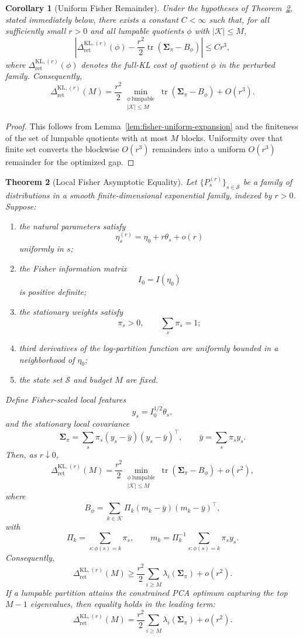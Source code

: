 \documentclass[12pt]{article}
\newtheorem{theorem}{Theorem}[section]
\newtheorem{corollary}[theorem]{Corollary}
\theoremstyle{definition}
\newcommand{\RetKLr}[1]{\Delta_{\mathrm{ret}}^{\mathrm{KL},(#1)}}
\begin{document}
\begin{corollary}[Uniform Fisher Remainder]
\label{cor:fisher-uniform-remainder}
Under the hypotheses of Theorem~\ref{thm:local-full-kl}, stated immediately
below, there exists a constant $C<\infty$ such that, for all sufficiently
small $r>0$ and all
lumpable quotients $\phi$ with $|\mathcal K|\le M$,
\[
\left|
\RetKLr{r}(\phi)
-
\frac{r^2}{2}
\operatorname{tr}(\bm{\Sigma}_\pi-B_\phi)
\right|
\le
C r^3,
\]
where $\RetKLr{r}(\phi)$ denotes the full-KL cost of quotient $\phi$ in the
perturbed family.  Consequently,
\[
\RetKLr{r}(M)
=
\frac{r^2}{2}
\min_{\substack{
\phi\ \text{lumpable}\\
|\mathcal K|\le M
}}
\operatorname{tr}(\bm{\Sigma}_\pi-B_\phi)
+
O(r^3).
\]
\end{corollary}

\begin{proof}
This follows from Lemma~\ref{lem:fisher-uniform-expansion} and the finiteness
of the set of lumpable quotients with at most $M$ blocks.  Uniformity over
that finite set converts the blockwise $O(r^3)$ remainders into a uniform
$O(r^3)$ remainder for the optimized gap.
\end{proof}

\begin{theorem}[Local Fisher Asymptotic Equality]
\label{thm:local-full-kl}
Let $\{P_s^{(r)}\}_{s\in\mathcal S}$ be a family of distributions in a smooth
finite-dimensional exponential family, indexed by $r>0$.  Suppose:
\begin{enumerate}[label=(\arabic*)]
\item the natural parameters satisfy
\[
\eta_s^{(r)}
=
\eta_0+r\theta_s+o(r)
\]
uniformly in $s$;
\item the Fisher information matrix
\[
I_0=I(\eta_0)
\]
is positive definite;
\item the stationary weights satisfy
\[
\pi_s>0,
\qquad
\sum_s\pi_s=1;
\]
\item third derivatives of the log-partition function are uniformly bounded in
a neighborhood of $\eta_0$;
\item the state set $\mathcal S$ and budget $M$ are fixed.
\end{enumerate}
Define Fisher-scaled local features
\[
y_s=I_0^{1/2}\theta_s,
\]
and the stationary local covariance
\[
\bm{\Sigma}_\pi
=
\sum_s
\pi_s
(y_s-\bar y)(y_s-\bar y)^\top,
\qquad
\bar y=\sum_s\pi_s y_s.
\]
Then, as $r\downarrow0$,
\[
\RetKLr{r}(M)
=
\frac{r^2}{2}
\min_{\substack{
\phi\ \text{lumpable}\\
|\mathcal K|\le M
}}
\operatorname{tr}(\bm{\Sigma}_\pi-B_\phi)
+
o(r^2),
\]
where
\[
B_\phi
=
\sum_{k\in\mathcal K}
\Pi_k
(m_k-\bar y)(m_k-\bar y)^\top,
\]
with
\[
\Pi_k=\sum_{s:\phi(s)=k}\pi_s,
\qquad
m_k=\Pi_k^{-1}\sum_{s:\phi(s)=k}\pi_s y_s.
\]
Consequently,
\[
\RetKLr{r}(M)
\ge
\frac{r^2}{2}
\sum_{i\ge M}
\lambda_i(\bm{\Sigma}_\pi)
+
o(r^2).
\]
If a lumpable partition attains the constrained PCA optimum capturing the top
$M-1$ eigenvalues, then equality holds in the leading term:
\[
\RetKLr{r}(M)
=
\frac{r^2}{2}
\sum_{i\ge M}
\lambda_i(\bm{\Sigma}_\pi)
+
o(r^2).
\]
\end{theorem}
\end{document}
